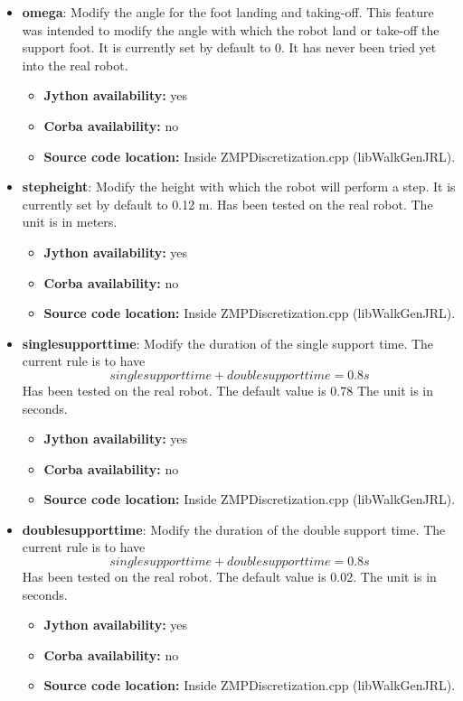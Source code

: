 \begin{itemize}
\item {\bf omega}: Modify the angle for the foot landing and taking-off. This feature was intended to modify
the angle with which the robot land or take-off the support foot. It is currently set by default to 0.
It has never been tried yet into the real robot.
\begin{itemize}
\item \textbf{Jython availability:} yes
\item \textbf{Corba availability:} no
\item \textbf{Source code location:} Inside ZMPDiscretization.cpp (libWalkGenJRL).
\end{itemize}


\item {\bf stepheight}: Modify the height with which the robot will perform a step.
It is currently set by default to 0.12 m. Has been tested on the real robot.
The unit is in meters.
\begin{itemize}
\item \textbf{Jython availability:} yes
\item \textbf{Corba availability:} no
\item \textbf{Source code location:} Inside ZMPDiscretization.cpp (libWalkGenJRL).
\end{itemize}

\item {\bf singlesupporttime}: Modify the duration of the single support time.
The current rule is to have
\begin{equation}
singlesupporttime+doublesupporttime=0.8 s
\end{equation}
Has been tested on the real robot. The default value is 0.78
The unit is in seconds.
\begin{itemize}
\item \textbf{Jython availability:} yes
\item \textbf{Corba availability:} no
\item \textbf{Source code location:} Inside ZMPDiscretization.cpp (libWalkGenJRL).
\end{itemize}

\item {\bf doublesupporttime}: Modify the duration of the double support time.
The current rule is to have
\begin{equation}
singlesupporttime+doublesupporttime=0.8 s
\end{equation}
Has been tested on the real robot.
 The default value is 0.02. The unit is in seconds.
\begin{itemize}
\item \textbf{Jython availability:} yes
\item \textbf{Corba availability:} no
\item \textbf{Source code location:} Inside ZMPDiscretization.cpp (libWalkGenJRL).
\end{itemize}

\end{itemize}

